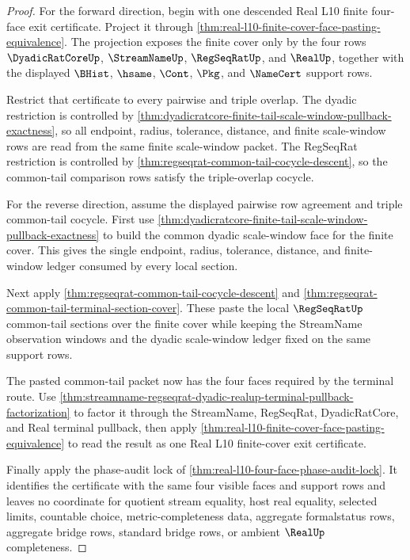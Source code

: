 \begin{proof}
For the forward direction, begin with one descended Real L10 finite four-face exit certificate. Project it through \autoref{thm:real-l10-finite-cover-face-pasting-equivalence}. The projection exposes the finite cover only by the four rows $\DyadicRatCoreUp$, $\StreamNameUp$, $\RegSeqRatUp$, and $\RealUp$, together with the displayed $\BHist$, $\hsame$, $\Cont$, $\Pkg$, and $\NameCert$ support rows.

Restrict that certificate to every pairwise and triple overlap. The dyadic restriction is controlled by \autoref{thm:dyadicratcore-finite-tail-scale-window-pullback-exactness}, so all endpoint, radius, tolerance, distance, and finite scale-window rows are read from the same finite scale-window packet. The RegSeqRat restriction is controlled by \autoref{thm:regseqrat-common-tail-cocycle-descent}, so the common-tail comparison rows satisfy the triple-overlap cocycle.

For the reverse direction, assume the displayed pairwise row agreement and triple common-tail cocycle. First use \autoref{thm:dyadicratcore-finite-tail-scale-window-pullback-exactness} to build the common dyadic scale-window face for the finite cover. This gives the single endpoint, radius, tolerance, distance, and finite-window ledger consumed by every local section.

Next apply \autoref{thm:regseqrat-common-tail-cocycle-descent} and \autoref{thm:regseqrat-common-tail-terminal-section-cover}. These paste the local $\RegSeqRatUp$ common-tail sections over the finite cover while keeping the StreamName observation windows and the dyadic scale-window ledger fixed on the same support rows.

The pasted common-tail packet now has the four faces required by the terminal route. Use \autoref{thm:streamname-regseqrat-dyadic-realup-terminal-pullback-factorization} to factor it through the StreamName, RegSeqRat, DyadicRatCore, and Real terminal pullback, then apply \autoref{thm:real-l10-finite-cover-face-pasting-equivalence} to read the result as one Real L10 finite-cover exit certificate.

Finally apply the phase-audit lock of \autoref{thm:real-l10-four-face-phase-audit-lock}. It identifies the certificate with the same four visible faces and support rows and leaves no coordinate for quotient stream equality, host real equality, selected limits, countable choice, metric-completeness data, aggregate formalstatus rows, aggregate bridge rows, standard bridge rows, or ambient $\RealUp$ completeness.
\end{proof}
